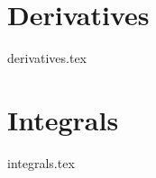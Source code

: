 \documentclass{article}
\begin{document}
\section{Derivatives}
    {derivatives.tex}
\section{Integrals}
    {integrals.tex}
\end{document}
